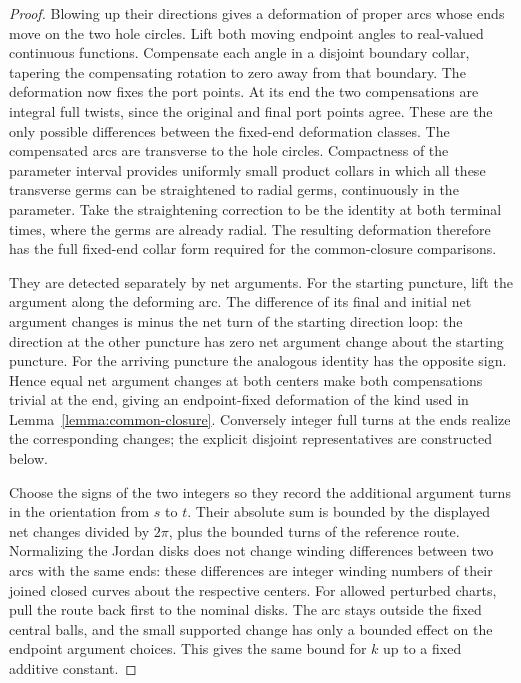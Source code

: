 \begin{proof}
Blowing up their directions gives a deformation of proper arcs whose
ends move on the two hole circles.  Lift both moving endpoint angles to
real-valued continuous functions.  Compensate each angle in a disjoint
boundary collar, tapering the compensating rotation to zero away from
that boundary.  The deformation now fixes the port points.  At its end
the two compensations are integral full twists, since the original and
final port points agree.  These are the only possible differences
between the fixed-end deformation classes.  The compensated arcs are
transverse to the hole circles.  Compactness of the parameter interval
provides uniformly small product collars in which all these transverse
germs can be straightened to radial germs, continuously in the
parameter.  Take the straightening correction to be the identity at
both terminal times, where the germs are already radial.  The resulting
deformation therefore has the full fixed-end collar form required for
the common-closure comparisons.

They are detected separately by net arguments.  For the starting
puncture, lift the argument along the deforming arc.  The difference of
its final and initial net argument changes is minus the net turn of the
starting direction loop: the direction at the other puncture has zero
net argument change about the starting puncture.  For the arriving
puncture the analogous identity has the opposite sign.  Hence equal
net argument changes at both centers make both compensations trivial
at the end, giving an endpoint-fixed deformation of the kind used in
Lemma~\ref{lemma:common-closure}.  Conversely integer full turns at the
ends realize the corresponding changes; the explicit disjoint
representatives are constructed below.

Choose the signs of the two integers so they record the additional
argument turns in the orientation from $s$ to $t$.  Their absolute sum
is bounded by the displayed net changes divided by $2\pi$, plus the
bounded turns of the reference route.  Normalizing the Jordan disks
does not change winding differences between two arcs with the same
ends: these differences are integer winding numbers of their joined
closed curves about the respective centers.  For allowed perturbed
charts, pull the route back first to the nominal disks.  The arc stays
outside the fixed central balls, and the small supported change has
only a bounded effect on the endpoint argument choices.  This gives
the same bound for $k$ up to a fixed additive constant.
\end{proof}

